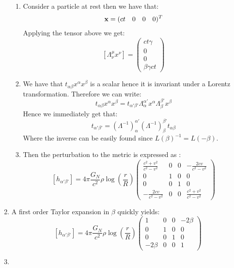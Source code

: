 \documentclass[10pt,a4paper]{article}
\begin{document}
\begin{enumerate}
\begin{enumerate}
\item Consider a particle at rest then we have that:
\[
\vb{x} = (ct \quad 0 \quad 0 \quad 0)^T
\]
Applying the tensor above we get:
\[
[\Lambda^\mu_\nu x^\nu] = \begin{pmatrix}
ct \gamma \\
0 \\
0 \\
\beta \gamma c t 
\end{pmatrix}
\]

\item We have that $t_{\alpha \beta}x^\alpha x^\beta$ is a scalar hence it is invariant under a Lorentz transformation. Therefore we can write:
\[
t_{\alpha \beta} x^\alpha x^\beta = t_{\alpha' \beta'} \Lambda^{\alpha'}_\alpha x^{\alpha} \Lambda^{\beta'}_\beta x^{\beta}
\]
Hence we immediately get that:
\[
t_{\alpha' \beta'} = (\Lambda^{-1})^{\alpha'}_{\alpha} (\Lambda^{-1})^{\beta'}_\beta t_{\alpha \beta}
\]
Where the inverse can be easily found since $L(\beta)^{-1} = L(-\beta)$. 

\item Then the perturbation to the metric is expressed as :
\[
[h_{\alpha'\beta'}] = 4 \pi \frac{G_N}{c^2} \rho \log(\frac{r}{R}) \begin{pmatrix}
\frac{c^2 + v^2}{c^2 - v^2} & 0 & 0 & -\frac{2 c v}{c^2 - v^2}\\
0 & 1 & 0 & 0\\
0 & 0 & 1 & 0\\
-\frac{2 c v}{c^2 - v^2} & 0 & 0 & \frac{c^2 + v^2}{c^2 - v^2}
\end{pmatrix}
\]


\end{enumerate}


\item  A first order Taylor expansion in $\beta$ quickly yields:
\[
[h_{\alpha' \beta'}] = 4 \pi \frac{G_N}{c^2} \rho \log(\frac{r}{R}) \begin{pmatrix}
1 & 0 & 0 & - 2 \beta\\
0 & 1 & 0 & 0\\
0 & 0 & 1 & 0\\
-2 \beta & 0 & 0 & 1
\end{pmatrix}
\]

\item \begin{enumerate}


\end{enumerate}
\end{enumerate}
\end{document}

